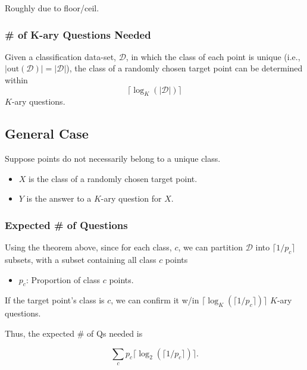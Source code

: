 \begin{warning}
    Roughly due to floor/ceil.
\end{warning}

\subsubsection{\# of K-ary Questions Needed}
\begin{theorem}
    Given a classification data-set, \( \mathcal{D} \), in which the class of each point is unique (i.e., \( |\text{out}(\mathcal{D})| = |\mathcal{D}| \)), the class of a randomly chosen target point can be determined within 
    \[
    \lceil \log_K (|\mathcal{D}|) \rceil
    \]
    \( K \)-ary questions.

\end{theorem}
\newpage

\subsection{General Case}
\begin{motivation}
    Suppose points do not necessarily belong to a unique class.
    \begin{itemize}
        \item \(X\) is the class of a randomly chosen target point.
        \item \(Y\) is the answer to a \(K\)-ary question for \(X\).
    \end{itemize}
\end{motivation}

\subsubsection{Expected \# of Questions}
\begin{definition}
    Using the theorem above, since for each class, \( c \), we can partition \( \mathcal{D} \) into \( \lceil 1 / p_c \rceil \) subsets, with a subset containing all class \( c \) points
    \begin{itemize}
        \item \( p_c \): Proportion of class \( c \) points.
    \end{itemize}
    \vspace{1em}

    If the target point’s class is \( c \), we can confirm it w/in \( \lceil \log_K (\lceil 1 / p_c \rceil) \rceil \) \( K \)-ary questions. 
    \vspace{1em}

    Thus, the expected \# of Qs needed is
    
    \[
    \sum_c p_c \lceil \log_2 (\lceil 1 / p_c \rceil) \rceil.
    \]
\end{definition}

